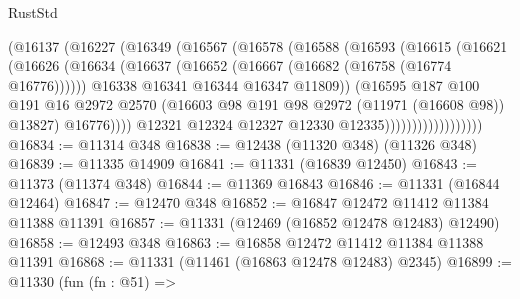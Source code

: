 \begin{lexlean}{RustStd}
\begin{coremodule}
                            (@16137
                              (@16227
                                (@16349
                                  (@16567
                                    (@16578
                                      (@16588
                                        (@16593
                                          (@16615
                                            (@16621
                                              (@16626
                                                (@16634
                                                  (@16637
                                                    (@16652
                                                      (@16667 (@16682 (@16758 (@16774 @16776))))))
                                                  @16338
                                                  @16341
                                                  @16344
                                                  @16347
                                                  @11809))
                                              (@16595
                                                @187
                                                @100
                                                @191
                                                @16
                                                @2972
                                                @2570
                                                (@16603
                                                  @98
                                                  @191
                                                  @98
                                                  @2972
                                                  (@11971 (@16608 @98))
                                                  @13827)
                                                @16776))))
                                        @12321
                                        @12324
                                        @12327
                                        @12330
                                        @12335))))))))))))))))))
@16834 := @11314 @348
@16838 := @12438 (@11320 @348) (@11326 @348)
@16839 := @11335 @14909
@16841 := @11331 (@16839 @12450)
@16843 := @11373 (@11374 @348)
@16844 := @11369 @16843
@16846 := @11331 (@16844 @12464)
@16847 := @12470 @348
@16852 := @16847 @12472 @11412 @11384 @11388 @11391
@16857 := @11331 (@12469 (@16852 @12478 @12483) @12490)
@16858 := @12493 @348
@16863 := @16858 @12472 @11412 @11384 @11388 @11391
@16868 := @11331 (@11461 (@16863 @12478 @12483) @2345)
@16899 := @11330
    (fun (fn : @51) =>

\end{coremodule}
\end{lexlean}
